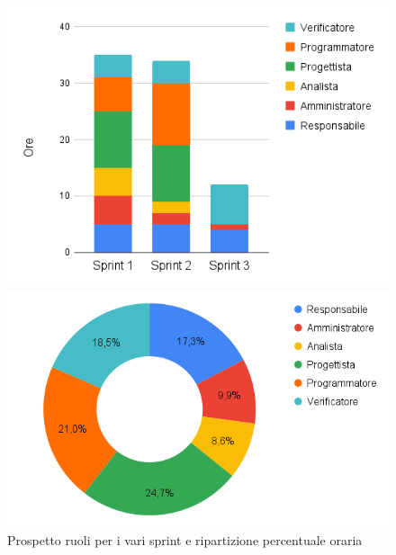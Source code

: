 \begin{figure}[h!]
	\centering
	\begin{minipage}[c]{0.3\textwidth}
    	\includegraphics[scale=0.5]{../../assets/Diagrammi_Excel/sprint_tec.png}
	\end{minipage}
\hfill
	\begin{minipage}[c]{0.46\textwidth}
		\includegraphics[scale=0.37]{../../assets/Diagrammi_Excel/tortatec.png}
	\end{minipage}
	\caption{Prospetto ruoli per i vari sprint e ripartizione percentuale oraria}
\end{figure}

